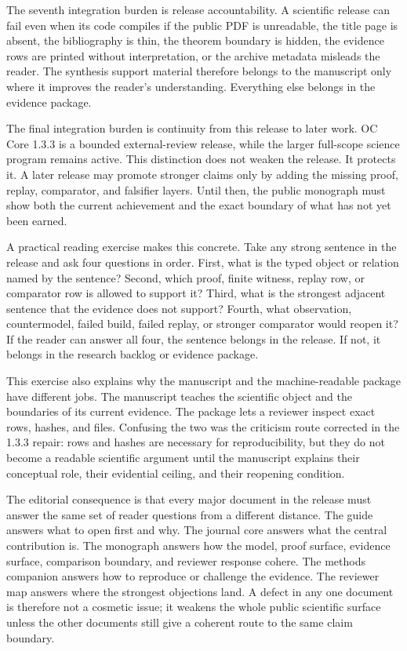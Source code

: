 The seventh integration burden is release accountability. A scientific release can fail even when its code compiles if the public PDF is unreadable, the title page is absent, the bibliography is thin, the theorem boundary is hidden, the evidence rows are printed without interpretation, or the archive metadata misleads the reader. The synthesis support material therefore belongs to the manuscript only where it improves the reader's understanding. Everything else belongs in the evidence package.


The final integration burden is continuity from this release to later work. OC Core 1.3.3 is a bounded external-review release, while the larger full-scope science program remains active. This distinction does not weaken the release. It protects it. A later release may promote stronger claims only by adding the missing proof, replay, comparator, and falsifier layers. Until then, the public monograph must show both the current achievement and the exact boundary of what has not yet been earned.


A practical reading exercise makes this concrete. Take any strong sentence in the release and ask four questions in order. First, what is the typed object or relation named by the sentence? Second, which proof, finite witness, replay row, or comparator row is allowed to support it? Third, what is the strongest adjacent sentence that the evidence does not support? Fourth, what observation, countermodel, failed build, failed replay, or stronger comparator would reopen it? If the reader can answer all four, the sentence belongs in the release. If not, it belongs in the research backlog or evidence package.


This exercise also explains why the manuscript and the machine-readable package have different jobs. The manuscript teaches the scientific object and the boundaries of its current evidence. The package lets a reviewer inspect exact rows, hashes, and files. Confusing the two was the criticism route corrected in the 1.3.3 repair: rows and hashes are necessary for reproducibility, but they do not become a readable scientific argument until the manuscript explains their conceptual role, their evidential ceiling, and their reopening condition.


The editorial consequence is that every major document in the release must answer the same set of reader questions from a different distance. The guide answers what to open first and why. The journal core answers what the central contribution is. The monograph answers how the model, proof surface, evidence surface, comparison boundary, and reviewer response cohere. The methods companion answers how to reproduce or challenge the evidence. The reviewer map answers where the strongest objections land. A defect in any one document is therefore not a cosmetic issue; it weakens the whole public scientific surface unless the other documents still give a coherent route to the same claim boundary.


